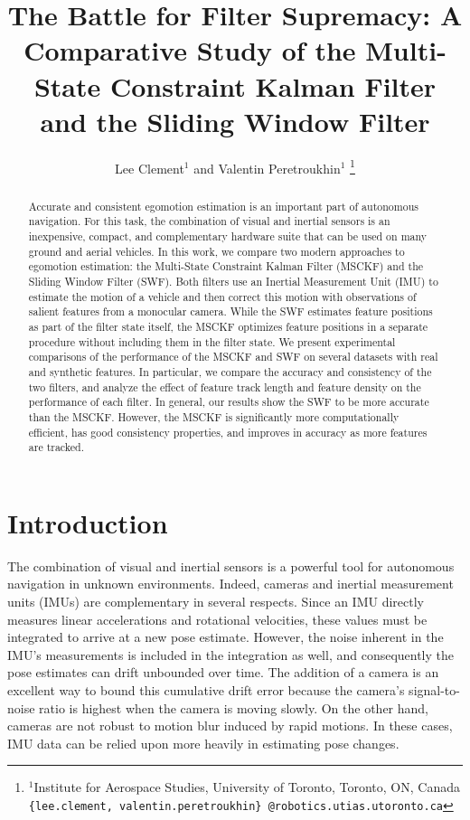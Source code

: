 \documentclass[letterpaper, 10 pt, conference]{ieeeconf}  %
\title{\LARGE \bf
The Battle for Filter Supremacy: A Comparative Study of the Multi-State Constraint Kalman Filter and the Sliding Window Filter
}
\author{Lee Clement$^{1}$ and Valentin Peretroukhin$^{1}$%
\thanks{$^{1}$Institute for Aerospace Studies,
        University of Toronto, Toronto, ON, Canada
        {\tt \{lee.clement, valentin.peretroukhin\} @robotics.utias.utoronto.ca}
        }%
}
\begin{document}
\maketitle
\thispagestyle{empty}
\pagestyle{empty}


\begin{abstract}
Accurate and consistent egomotion estimation is an important part of autonomous navigation.
For this task, the combination of visual and inertial sensors is an inexpensive, compact, and complementary hardware suite that can be used on many ground and aerial vehicles.
In this work, we compare two modern approaches to egomotion estimation: the Multi-State Constraint Kalman Filter (MSCKF) and the Sliding Window Filter (SWF).
Both filters use an Inertial Measurement Unit (IMU) to estimate the motion of a vehicle and then correct this motion with observations of salient features from a monocular camera.
While the SWF estimates feature positions as part of the filter state itself, the MSCKF optimizes feature positions in a separate procedure without including them in the filter state.
We present experimental comparisons of the performance of the MSCKF and SWF on several datasets with real and synthetic features.
In particular, we compare the accuracy and consistency of the two filters, and analyze the effect of feature track length and feature density on the performance of each filter.
In general, our results show the SWF to be more accurate than the MSCKF.
However, the MSCKF is significantly more computationally efficient, has good consistency properties, and improves in accuracy as more features are tracked. 
\end{abstract}


\section{Introduction} \label{sec:introduction}

The combination of visual and inertial sensors is a powerful tool for autonomous navigation in unknown environments.
Indeed, cameras and inertial measurement units (IMUs) are complementary in several respects.
Since an IMU directly measures linear accelerations and rotational velocities, these values must be integrated to arrive at a new pose estimate.
However, the noise inherent in the IMU's measurements is included in the integration as well, and consequently the pose estimates can drift unbounded over time.
The addition of a camera is an excellent way to bound this cumulative drift error because the camera's signal-to-noise ratio is highest when the camera is moving slowly.
On the other hand, cameras are not robust to motion blur induced by rapid motions.
In these cases, IMU data can be relied upon more heavily in estimating pose changes.
\end{document}
